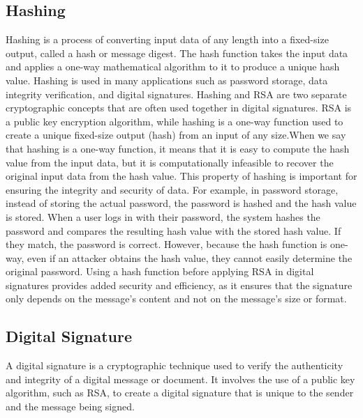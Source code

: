 \subsection*{Hashing}
Hashing is a process of converting input data of any length into a fixed-size output, called a hash or message digest.
The hash function takes the input data and applies a one-way mathematical algorithm to it to produce a unique hash value.
Hashing is used in many applications such as password storage, data integrity verification, and digital signatures.
Hashing and RSA are two separate cryptographic concepts that are often used together in digital signatures. RSA is a public key encryption algorithm,
while hashing is a one-way function used to create a unique fixed-size output (hash) from an input of any size.When we say that hashing is a one-way function,
it means that it is easy to compute the hash value from the input data, but it is computationally infeasible to recover the original input data from the hash value.
This property of hashing is important for ensuring the integrity and security of data. For example, in password storage, instead of storing the actual password, the password is hashed and the hash value is stored.
When a user logs in with their password, the system hashes the password and compares the resulting hash value with the stored hash value. If they match, the password is correct.
However, because the hash function is one-way, even if an attacker obtains the hash value, they cannot easily determine the original password.
Using a hash function before applying RSA in digital signatures provides added security and efficiency, as it ensures that the signature only depends on the message's content and not on the message's size or format.

\subsection*{Digital Signature}
A digital signature is a cryptographic technique used to verify the authenticity and integrity of a digital message or document.
It involves the use of a public key algorithm, such as RSA, to create a digital signature that is unique to the sender and the message being signed.
